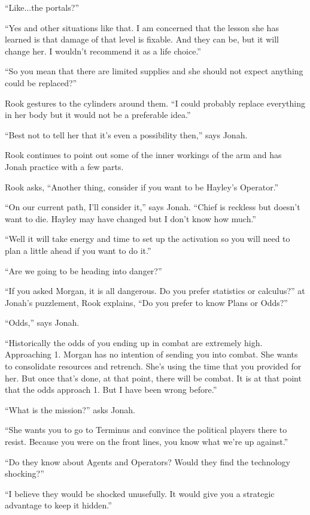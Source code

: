 ``Like...the portals?''

``Yes and other situations like that.  I am concerned that the lesson she has learned is that damage of that level is fixable.  And they can be, but it will change her.  I wouldn't recommend it as a life choice.''

``So you mean that there are limited supplies and she should not expect anything could be replaced?''

Rook gestures to the cylinders around them.  ``I could probably replace everything in her body but it would not be a preferable idea.''

``Best not to tell her that it's even a possibility then,'' says Jonah.

Rook continues to point out some of the inner workings of the arm and has Jonah practice with a few parts.

Rook asks, ``Another thing, consider if you want to be Hayley's Operator.''

``On our current path, I'll consider it,'' says Jonah.  ``Chief is reckless but doesn't want to die.  Hayley may have changed but I don't know how much.''

``Well it will take energy and time to set up the activation so you will need to plan a little ahead if you want to do it.''

``Are we going to be heading into danger?''

``If you asked Morgan, it is all dangerous.  Do you prefer statistics or calculus?''  at Jonah's puzzlement, Rook explains, ``Do you prefer to know Plans or Odds?''

``Odds,'' says Jonah.

``Historically the odds of you ending up in combat are extremely high. Approaching 1.  Morgan has no intention of sending you into combat.  She wants to consolidate resources and retrench.  She's using the time that you provided for her.  But once that's done, at that point, there will be combat.  It is at that point that the odds approach 1.  But I have been wrong before.''

``What is the mission?'' asks Jonah.

``She wants you to go to Terminus and convince the political players there to resist. Because you were on the front lines, you know what we're up against.''

``Do they know about Agents and Operators?  Would they find the technology shocking?''

``I believe they would be shocked unusefully.  It would give you a strategic advantage to keep it hidden.''

